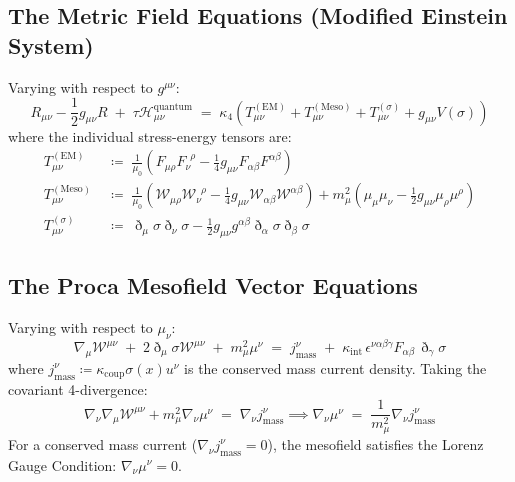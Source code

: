 \documentclass[
    12pt,
    a4paper,
    headings=normal,
    twoside=false,
    open=any,
    parskip=half
]{scrbook}
\newcommand{\ethop}{\eth}
\begin{document}
\subsection{The Metric Field Equations (Modified Einstein System)}
Varying with respect to $g^{\mu\nu}$:
\begin{equation}
\boxed{R_{\mu\nu} - \frac{1}{2}g_{\mu\nu} R \;+\; \tau \mathcal{H}_{\mu\nu}^{\text{quantum}} \;=\; \kappa_4 \left( T_{\mu\nu}^{(\text{EM})} + T_{\mu\nu}^{(\text{Meso})} + T_{\mu\nu}^{(\sigma)} + g_{\mu\nu} V(\sigma) \right)}
\label{eq:ch2_modified_einstein_master}
\end{equation}
where the individual stress-energy tensors are:
\begin{align}
T_{\mu\nu}^{(\text{EM})} &\;\coloneqq\; \frac{1}{\mu_0}\left( F_{\mu\rho} F_\nu^{\phantom{\nu}\rho} - \frac{1}{4}g_{\mu\nu} F_{\alpha\beta} F^{\alpha\beta} \right) \label{eq:ch2_T_EM} \\
T_{\mu\nu}^{(\text{Meso})} &\;\coloneqq\; \frac{1}{\mu_0}\left( \mathcal{W}_{\mu\rho} \mathcal{W}_\nu^{\phantom{\nu}\rho} - \frac{1}{4}g_{\mu\nu} \mathcal{W}_{\alpha\beta}\mathcal{W}^{\alpha\beta} \right) + m_\mu^2 \left( \mu_\mu \mu_\nu - \frac{1}{2}g_{\mu\nu} \mu_\rho \mu^\rho \right) \label{eq:ch2_T_Meso} \\
T_{\mu\nu}^{(\sigma)} &\;\coloneqq\; \ethop_\mu \sigma \ethop_\nu \sigma - \frac{1}{2}g_{\mu\nu} g^{\alpha\beta}\ethop_\alpha\sigma \ethop_\beta\sigma \label{eq:ch2_T_sigma}
\end{align}

\subsection{The Proca Mesofield Vector Equations}
Varying with respect to $\mu_\nu$:
\begin{equation}
\boxed{\nabla_\mu \mathcal{W}^{\mu\nu} \;+\; 2 \ethop_\mu \sigma \mathcal{W}^{\mu\nu} \;+\; m_\mu^2 \mu^\nu \;=\; j_{\text{mass}}^\nu \;+\; \kappa_{\text{int}} \, \epsilon^{\nu\alpha\beta\gamma} F_{\alpha\beta} \, \ethop_\gamma \sigma}
\label{eq:ch2_proca_field_equation_master}
\end{equation}
where $j_{\text{mass}}^\nu \coloneqq \kappa_{\text{coup}} \sigma(x) u^\nu$ is the conserved mass current density. Taking the covariant 4-divergence:
\begin{equation}
\nabla_\nu \nabla_\mu \mathcal{W}^{\mu\nu} + m_\mu^2 \nabla_\nu \mu^\nu \;=\; \nabla_\nu j_{\text{mass}}^\nu \implies \nabla_\nu \mu^\nu \;=\; \frac{1}{m_\mu^2} \nabla_\nu j_{\text{mass}}^\nu
\label{eq:ch2_lorentz_proca_divergence}
\end{equation}
For a conserved mass current ($\nabla_\nu j_{\text{mass}}^\nu = 0$), the mesofield satisfies the Lorenz Gauge Condition: $\nabla_\nu \mu^\nu = 0$.
\end{document}
